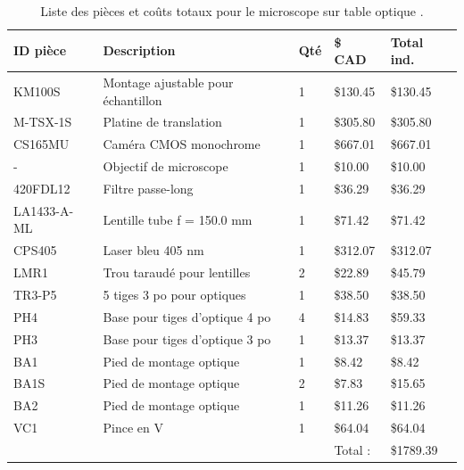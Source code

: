 \documentclass[11pt,letterpaper]{article}
\begin{document}
\begin{table}[!ht]
    \centering
    \caption{Liste des pièces et coûts totaux pour le microscope sur table optique
    \cite{noauthor_thorlabs_2024} \cite{noauthor_m-tsx-1d_2024}.}
    \begin{tabular}{|l|l|l|l|l|}
    \hline
        ID pièce & Description & Qté & \$ CAD & Total ind. \\ \hline\hline
        KM100S & Montage ajustable pour échantillon & 1 & \$130.45 & \$130.45 \\ \hline
        M-TSX-1S & Platine de translation & 1 & \$305.80 & \$305.80 \\ \hline
        CS165MU & Caméra CMOS monochrome & 1 & \$667.01 & \$667.01 \\ \hline
        - & Objectif de microscope & 1 & \$10.00 & \$10.00 \\ \hline
        420FDL12 & Filtre passe-long & 1 & \$36.29 & \$36.29 \\ \hline
        LA1433-A-ML & Lentille tube f = 150.0 mm & 1 & \$71.42 & \$71.42 \\ \hline
        CPS405 & Laser bleu 405 nm & 1 & \$312.07 & \$312.07 \\ \hline
        LMR1 & Trou taraudé pour lentilles & 2 & \$22.89 & \$45.79 \\ \hline
        TR3-P5 & 5 tiges 3 po pour optiques & 1 & \$38.50 & \$38.50 \\ \hline
        PH4 & Base pour tiges d'optique 4 po & 4 & \$14.83 & \$59.33 \\ \hline
        PH3 & Base pour tiges d'optique 3 po & 1 & \$13.37 & \$13.37 \\ \hline
        BA1 & Pied de montage optique & 1 & \$8.42 & \$8.42 \\ \hline
        BA1S & Pied de montage optique & 2 & \$7.83 & \$15.65 \\ \hline
        BA2 & Pied de montage optique & 1 & \$11.26 & \$11.26 \\ \hline
        VC1 & Pince en V & 1 & \$64.04 & \$64.04 \\ \hline\hline
        ~ & ~ & ~ & Total : & \$1789.39 \\ \hline
    \end{tabular}
    \label{table_cout}
\end{table}

\end{document}
